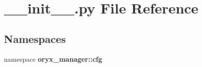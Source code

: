 \section{\-\_\-\-\_\-init\-\_\-\-\_\-.\-py \-File \-Reference}
\label{cfg_2____init_____8py}
\subsection*{\-Namespaces}
\begin{DoxyCompactItemize}
\item 
namespace {\bf oryx\-\_\-manager\-::cfg}
\end{DoxyCompactItemize}
